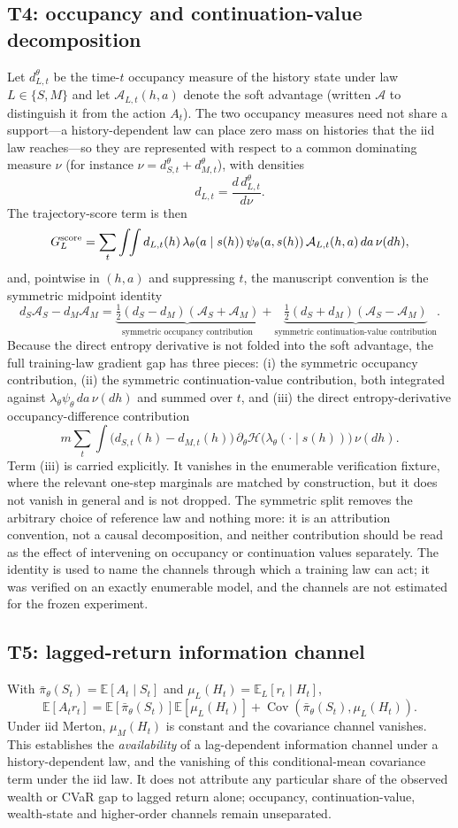 \documentclass[11pt]{article}
\newcommand{\E}{\mathbb E}
\newcommand{\Cov}{\operatorname{Cov}}
\begin{document}
\subsection*{T4: occupancy and continuation-value decomposition}
Let $d^\theta_{L,t}$ be the time-$t$ occupancy measure of the history state under law $L\in\{S,M\}$ and let $\mathcal A_{L,t}(h,a)$ denote the soft advantage (written $\mathcal A$ to distinguish it from the action $A_t$). The two occupancy measures need not share a support---a history-dependent law can place zero mass on histories that the iid law reaches---so they are represented with respect to a common dominating measure $\nu$ (for instance $\nu=d^\theta_{S,t}+d^\theta_{M,t}$), with densities
\[
d_{L,t}=\frac{d\,d^\theta_{L,t}}{d\nu}.
\]
The trajectory-score term is then
\[
G^{\rm score}_L=\sum_t\int\!\!\int d_{L,t}(h)\,\lambda_\theta(a\mid s(h))\,\psi_\theta(a,s(h))\,\mathcal A_{L,t}(h,a)\,da\,\nu(dh),
\]
and, pointwise in $(h,a)$ and suppressing $t$, the manuscript convention is the symmetric midpoint identity
\[
d_S\mathcal A_S-d_M\mathcal A_M=\underbrace{\tfrac12(d_S-d_M)(\mathcal A_S+\mathcal A_M)}_{\text{symmetric occupancy contribution}}+\underbrace{\tfrac12(d_S+d_M)(\mathcal A_S-\mathcal A_M)}_{\text{symmetric continuation-value contribution}}.
\]
Because the direct entropy derivative is not folded into the soft advantage, the full training-law gradient gap has three pieces: (i) the symmetric occupancy contribution, (ii) the symmetric continuation-value contribution, both integrated against $\lambda_\theta\psi_\theta\,da\,\nu(dh)$ and summed over $t$, and (iii) the direct entropy-derivative occupancy-difference contribution
\[
m\sum_t\int\big(d_{S,t}(h)-d_{M,t}(h)\big)\,\partial_\theta \mathcal H\big(\lambda_\theta(\cdot\mid s(h))\big)\,\nu(dh).
\]
Term (iii) is carried explicitly. It vanishes in the enumerable verification fixture, where the relevant one-step marginals are matched by construction, but it does not vanish in general and is not dropped. The symmetric split removes the arbitrary choice of reference law and nothing more: it is an attribution convention, not a causal decomposition, and neither contribution should be read as the effect of intervening on occupancy or continuation values separately. The identity is used to name the channels through which a training law can act; it was verified on an exactly enumerable model, and the channels are not estimated for the frozen experiment.

\subsection*{T5: lagged-return information channel}
With $\bar\pi_\theta(S_t)=\E[A_t\mid S_t]$ and $\mu_L(H_t)=\E_L[r_t\mid H_t]$,
\[
\E[A_tr_t]=\E[\bar\pi_\theta(S_t)]\E[\mu_L(H_t)]+\Cov(\bar\pi_\theta(S_t),\mu_L(H_t)).
\]
Under iid Merton, $\mu_M(H_t)$ is constant and the covariance channel vanishes.
This establishes the \emph{availability} of a lag-dependent information channel under a history-dependent law, and the vanishing of this conditional-mean covariance term under the iid law. It does not attribute any particular share of the observed wealth or CVaR gap to lagged return alone; occupancy, continuation-value, wealth-state and higher-order channels remain unseparated.
\end{document}

